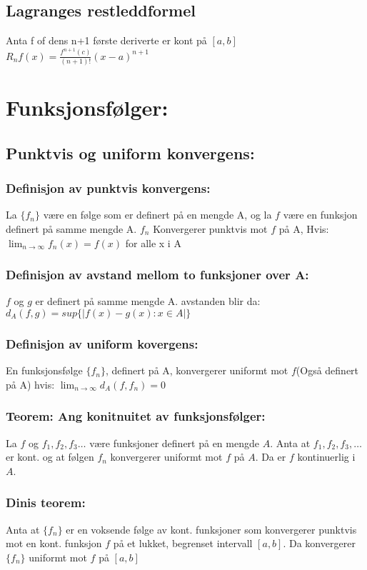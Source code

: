 \documentclass[12pt,a4paper,twocolumn,twoside]{article}
\def\abs#1{\lvert #1 \rvert}
\begin{document}
        \subsection*{Lagranges restleddformel}
        Anta f of dens n+1 første deriverte er kont på $[a,b]$\\
        $R_nf(x) = \frac{f^{n+1}(c)}{(n+1)!}(x-a)^{n+1}$
    \section*{Funksjonsfølger:}
        \subsection*{Punktvis og uniform konvergens:}
            \subsubsection*{Definisjon av punktvis konvergens:}
            La $\{f_n\}$ være en følge som er definert på en mengde A, og la $f$ være en funksjon definert på 
            samme mengde A. ${f_n}$ Konvergerer punktvis mot $f$ på A, Hvis:
            $\lim_{n\to\infty}f_n(x)=f(x)$ for alle x i A
            \subsubsection*{Definisjon av avstand mellom to funksjoner over A:}
            $f$ og $g$ er definert på samme mengde A. avstanden blir da:
            $d_A(f,g) = sup\{\abs{f(x)-g(x):x\in A}\}$
            \subsubsection*{Definisjon av uniform kovergens:}
            En funksjonsfølge $\{f_n\}$, definert på A, konvergerer uniformt mot $f$(Også definert på A) hvis:
            $\lim_{n\to\infty}d_A(f,f_n) = 0$
            \subsubsection*{Teorem: Ang konitnuitet av funksjonsfølger:}
            La $f$ og $f_1,f_2,f_3\dots$ være funksjoner definert på en mengde $A$. Anta at $f_1,f_2, f_3,\dots$ er kont.
            og at følgen ${f_n}$ konvergerer uniformt mot $f$ på $A$. Da er $f$ kontinuerlig i $A$.
            \subsubsection*{Dinis teorem:}
            Anta at $\{f_n\}$ er en voksende følge av kont. funksjoner som konvergerer punktvis mot en kont.
            funksjon $f$ på et lukket, begrenset intervall $[a,b]$. Da konvergerer $\{f_n\}$ uniformt mot $f$ på $[a,b]$
\end{document}
